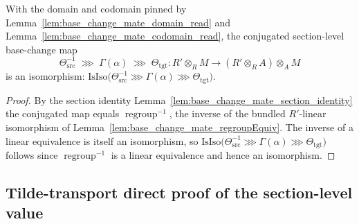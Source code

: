 \begin{lemma}


  \label{lem:base_change_mate_generator_trace}
  With the domain and codomain pinned by Lemma~\ref{lem:base_change_mate_domain_read}
  and Lemma~\ref{lem:base_change_mate_codomain_read}, the conjugated section-level
  base-change map
  \[
    \Theta_{\mathrm{src}}^{-1} \;\ggg\; \Gamma(\alpha) \;\ggg\; \Theta_{\mathrm{tgt}} :
    R' \otimes_R M \longrightarrow (R' \otimes_R A) \otimes_A M
  \]
  is an isomorphism: \(\mathrm{IsIso}\bigl(\Theta_{\mathrm{src}}^{-1} \ggg \Gamma(\alpha)
  \ggg \Theta_{\mathrm{tgt}}\bigr)\).
\end{lemma}

\begin{proof}
  By the section identity Lemma~\ref{lem:base_change_mate_section_identity}
  the conjugated map equals \(\operatorname{regroup}^{-1}\), the inverse of the bundled
  \(R'\)-linear isomorphism of Lemma~\ref{lem:base_change_mate_regroupEquiv}. The inverse
  of a linear equivalence is itself an isomorphism, so
  \(\mathrm{IsIso}\bigl(\Theta_{\mathrm{src}}^{-1} \ggg \Gamma(\alpha)
  \ggg \Theta_{\mathrm{tgt}}\bigr)\) follows since \(\operatorname{regroup}^{-1}\)
  is a linear equivalence and hence an isomorphism.
\end{proof}

\subsection{Tilde-transport direct proof of the section-level value}
\label{sec:fbc_tilde_transport_direct}


